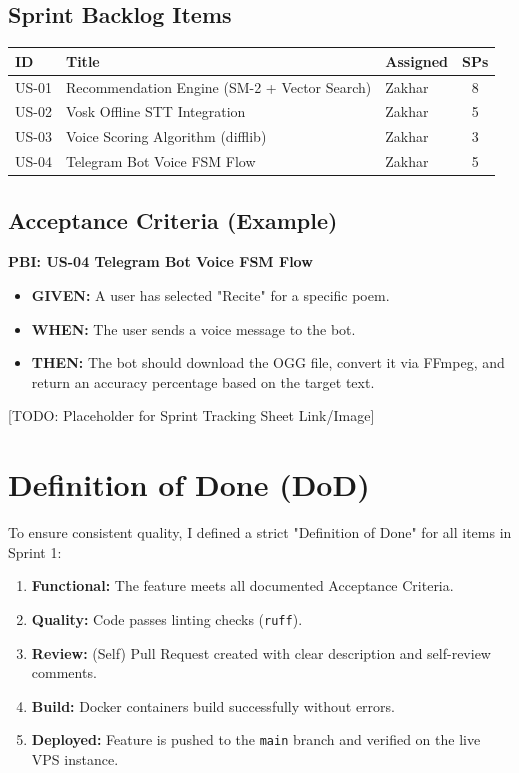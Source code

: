 \documentclass[12pt]{article}
\begin{document}
\subsection{Sprint Backlog Items}
\begin{table}[h!]
\centering
\begin{tabularx}{\textwidth}{lXlc}
\toprule
\textbf{ID} & \textbf{Title} & \textbf{Assigned} & \textbf{SPs} \\
\midrule
US-01 & Recommendation Engine (SM-2 + Vector Search) & Zakhar & 8 \\
US-02 & Vosk Offline STT Integration & Zakhar & 5 \\
US-03 & Voice Scoring Algorithm (difflib) & Zakhar & 3 \\
US-04 & Telegram Bot Voice FSM Flow & Zakhar & 5 \\
\bottomrule
\end{tabularx}
\end{table}

\subsection{Acceptance Criteria (Example)}
\textbf{PBI: US-04 Telegram Bot Voice FSM Flow}
\begin{itemize}
    \item \textbf{GIVEN:} A user has selected "Recite" for a specific poem.
    \item \textbf{WHEN:} The user sends a voice message to the bot.
    \item \textbf{THEN:} The bot should download the OGG file, convert it via FFmpeg, and return an accuracy percentage based on the target text.
\end{itemize}

[TODO: Placeholder for Sprint Tracking Sheet Link/Image]

\section{Definition of Done (DoD)}

To ensure consistent quality, I defined a strict "Definition of Done" for all items in Sprint 1:
\begin{enumerate}[label=\alph*)]
    \item \textbf{Functional:} The feature meets all documented Acceptance Criteria.
    \item \textbf{Quality:} Code passes linting checks (\texttt{ruff}).
    \item \textbf{Review:} (Self) Pull Request created with clear description and self-review comments.
    \item \textbf{Build:} Docker containers build successfully without errors.
    \item \textbf{Deployed:} Feature is pushed to the \texttt{main} branch and verified on the live VPS instance.
\end{enumerate}
\end{document}
